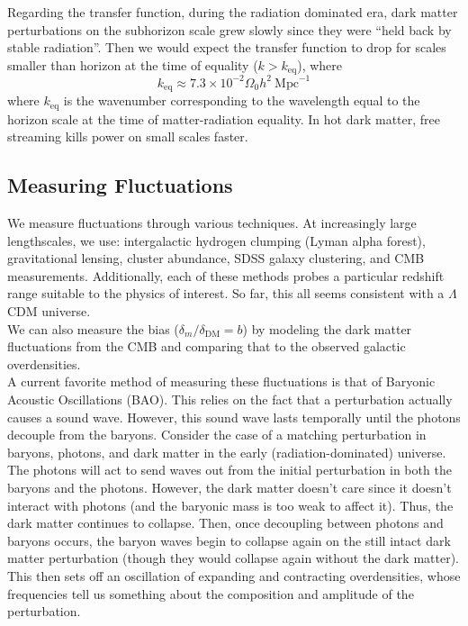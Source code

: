 \documentclass[10pt]{article}
\numberwithin{equation}{section}
\newcommand{\n}{\noindent}
\begin{document}
		\n Regarding the transfer function, during the radiation dominated era, dark matter perturbations on the subhorizon scale grew slowly since they were ``held back by stable radiation''. Then we would expect the transfer function to drop for scales smaller than horizon at the time of equality ($k>k_{\mathrm{eq}}$), where
		\begin{equation}
			\label{eq:large:12} k_{\mathrm{eq}}\approx 7.3\times 10^{-2}\Omega_0 h^2\ \mathrm{Mpc}^{-1}
		\end{equation}
		where $k_{\mathrm{eq}}$ is the wavenumber corresponding to the wavelength equal to the horizon scale at the time of matter-radiation equality. In hot dark matter, free streaming kills power on small scales faster.
	\subsection{Measuring Fluctuations} %
	\label{sub:measuring_fluctuations}
	We measure fluctuations through various techniques. At increasingly large lengthscales, we use: intergalactic hydrogen clumping (Lyman alpha forest), gravitational lensing, cluster abundance, SDSS galaxy clustering, and CMB measurements. Additionally, each of these methods probes a particular redshift range suitable to the physics of interest. So far, this all seems consistent with a $\Lambda$CDM universe.\\
	
	\n We can also measure the bias ($\delta_m/\delta_{\mathrm{DM}}=b$) by modeling the dark matter fluctuations from the CMB and comparing that to the observed galactic overdensities.\\
	
	\n A current favorite method of measuring these fluctuations is that of Baryonic Acoustic Oscillations (BAO). This relies on the fact that a perturbation actually causes a sound wave. However, this sound wave lasts temporally until the photons decouple from the baryons. Consider the case of a matching perturbation in baryons, photons, and dark matter in the early (radiation-dominated) universe. The photons will act to send waves out from the initial perturbation in both the baryons and the photons. However, the dark matter doesn't care since it doesn't interact with photons (and the baryonic mass is too weak to affect it). Thus, the dark matter continues to collapse. Then, once decoupling between photons and baryons occurs, the baryon waves begin to collapse again on the still intact dark matter perturbation (though they would collapse again without the dark matter). This then sets off an oscillation of expanding and contracting overdensities, whose frequencies tell us something about the composition and amplitude of the perturbation.\\
	
\end{document}
